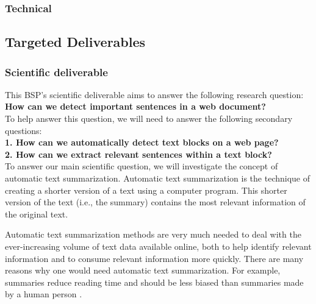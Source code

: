 \documentclass[conference,compsoc]{IEEEtran}
\begin{document}

\lipsum[][1-2]

\subsubsection{Technical}


\lipsum[][1-2]

\subsection{Targeted Deliverables}
\label{sec-deliverables}

\subsubsection{Scientific deliverable}


This BSP's scientific deliverable aims to answer the following research question:\\

\textbf{How can we detect important sentences in a web document?}\\

To help answer this question, we will need to answer the following secondary questions:\\

\textbf{1. How can we automatically detect text blocks on a web page?}\\

\textbf{2. How can we extract relevant sentences within a text block?}\\

To answer our main scientific question, we will investigate the concept of automatic text summarization. Automatic text summarization is the technique of creating a shorter version of a text using a computer program. This shorter version of the text (i.e., the summary) contains the most relevant information of the original text.

Automatic text summarization methods are very much needed to deal with the ever-increasing volume of text data available online, both to help identify relevant information and to consume relevant information more quickly. There are many reasons why one would need automatic text summarization. For example, summaries reduce reading time and should be less biased than summaries made by a human person \cite{torres2014automatic}.
\end{document}
